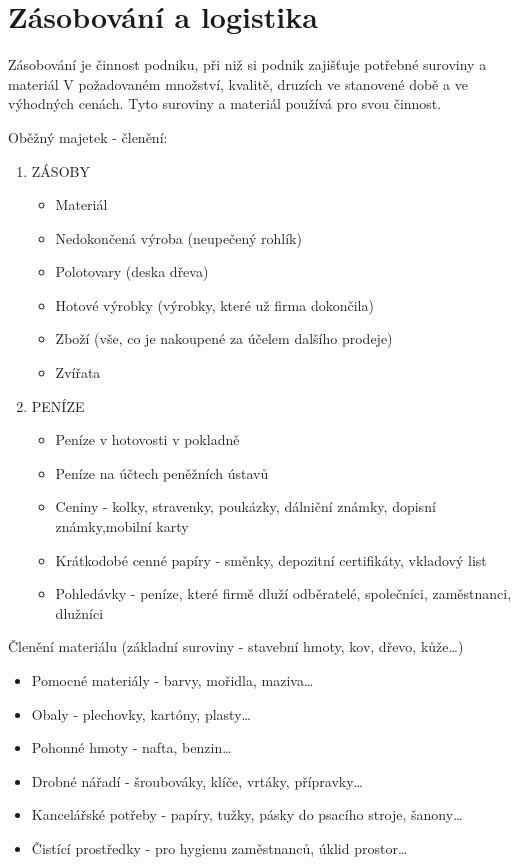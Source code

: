 \chapter{Zásobování a logistika}

Zásobování je činnost podniku, při niž si podnik zajišťuje potřebné suroviny a materiál V požadovaném množství, kvalitě, druzích ve stanovené době a ve výhodných cenách. Tyto suroviny a materiál používá pro svou činnost.

Oběžný majetek - členění:
\begin{enumerate}
    \item ZÁSOBY
        \begin{itemize}
            \item Materiál
            \item Nedokončená výroba (neupečený rohlík)
            \item Polotovary (deska dřeva)
            \item Hotové výrobky (výrobky, které už firma dokončila)
            \item Zboží (vše, co je nakoupené za účelem dalšího prodeje)
            \item Zvířata
        \end{itemize}
    \item PENÍZE
        \begin{itemize}
            \item Peníze v hotovosti v pokladně
            \item Peníze na účtech peněžních ústavů
            \item Ceniny - kolky, stravenky, poukázky, dálniční známky, dopisní známky,mobilní karty
            \item Krátkodobé cenné papíry - směnky, depozitní certifikáty, vkladový list
            \item Pohledávky - peníze, které firmě dluží odběratelé, společníci, zaměstnanci, dlužníci
        \end{itemize}		
\end{enumerate}

Členění materiálu (základní suroviny - stavební hmoty, kov, dřevo, kůže\ldots)
\begin{itemize}
    \item Pomocné materiály - barvy, mořidla, maziva\ldots
    \item Obaly - plechovky, kartóny, plasty\ldots
    \item Pohonné hmoty - nafta, benzin\ldots
    \item Drobné nářadí - šroubováky, klíče, vrtáky, přípravky\ldots
    \item Kancelářské potřeby - papíry, tužky, pásky do psacího stroje, šanony\ldots
    \item Čistící prostředky - pro hygienu zaměstnanců, úklid prostor\ldots
\end{itemize}

